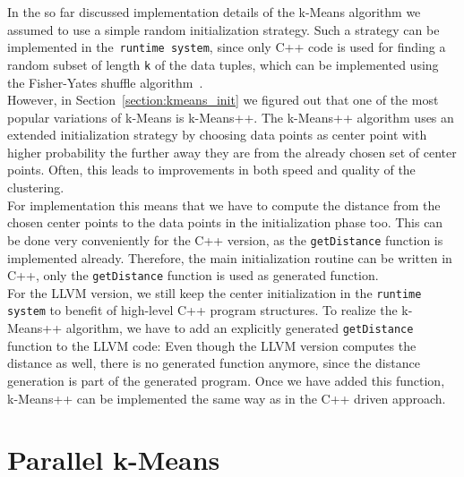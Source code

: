 In the so far discussed implementation details of the k-Means algorithm we assumed to use a simple random initialization strategy. Such a strategy can be implemented in the~\texttt{runtime system}, since only C++ code is used for finding a random subset of length \texttt{k} of the data tuples, which can be implemented using the Fisher-Yates shuffle algorithm~\parencite{fisheryates}. 
\\
However, in Section~\ref{section:kmeans_init} we figured out that one of the most popular variations of k-Means is k-Means++. The k-Means++ algorithm uses an extended initialization strategy by choosing data points as center point with higher probability the further away they are from the already chosen set of center points. Often, this leads to improvements in both speed and quality of the clustering.
\\
For implementation this means that we have to compute the distance from the chosen center points to the data points in the initialization phase too. This can be done very conveniently for the C++ version, as the \texttt{getDistance} function is implemented already. Therefore, the main initialization routine can be written in C++, only the \texttt{getDistance} function is used as generated function.
\\
For the LLVM version, we still keep the center initialization in the \texttt{runtime system} to benefit of high-level C++ program structures. To realize the k-Means++ algorithm, we have to add an explicitly generated \texttt{getDistance} function to the LLVM code: Even though the LLVM version computes the distance as well, there is no generated function anymore, since the distance generation is part of the generated program. Once we have added this function, k-Means++ can be implemented the same way as in the C++ driven approach.

\section{Parallel k-Means}\label{section:parallel_implementation}

